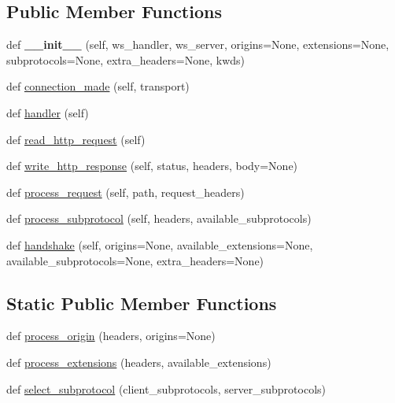 \subsection*{Public Member Functions}
\begin{DoxyCompactItemize}
\item 
\mbox{\label{classwebsockets_1_1server_1_1_web_socket_server_protocol_aa682b0485688aa1a697260b40134c7eb}} 
def {\bfseries \+\_\+\+\_\+init\+\_\+\+\_\+} (self, ws\+\_\+handler, ws\+\_\+server, origins=None, extensions=None, subprotocols=None, extra\+\_\+headers=None, kwds)
\item 
def \hyperlink{classwebsockets_1_1server_1_1_web_socket_server_protocol_aef052fe92634f71575968c743f1e30df}{connection\+\_\+made} (self, transport)
\item 
def \hyperlink{classwebsockets_1_1server_1_1_web_socket_server_protocol_a30403cdb02a26896309300c3ffba0e5b}{handler} (self)
\item 
def \hyperlink{classwebsockets_1_1server_1_1_web_socket_server_protocol_a00330bf7ea1eb9379ba86472cf5c2168}{read\+\_\+http\+\_\+request} (self)
\item 
def \hyperlink{classwebsockets_1_1server_1_1_web_socket_server_protocol_ab2e016a048a0bfc7986db4926e991411}{write\+\_\+http\+\_\+response} (self, status, headers, body=None)
\item 
def \hyperlink{classwebsockets_1_1server_1_1_web_socket_server_protocol_a128b1f24cae9c580c2fa1c98a5755315}{process\+\_\+request} (self, path, request\+\_\+headers)
\item 
def \hyperlink{classwebsockets_1_1server_1_1_web_socket_server_protocol_ab78e73b8a5929bac69346c49039ace85}{process\+\_\+subprotocol} (self, headers, available\+\_\+subprotocols)
\item 
def \hyperlink{classwebsockets_1_1server_1_1_web_socket_server_protocol_a1d684035030b0535f433a9aea1d40b29}{handshake} (self, origins=None, available\+\_\+extensions=None, available\+\_\+subprotocols=None, extra\+\_\+headers=None)
\end{DoxyCompactItemize}
\subsection*{Static Public Member Functions}
\begin{DoxyCompactItemize}
\item 
def \hyperlink{classwebsockets_1_1server_1_1_web_socket_server_protocol_aae78c71a11634a93628a94b8299f40f7}{process\+\_\+origin} (headers, origins=None)
\item 
def \hyperlink{classwebsockets_1_1server_1_1_web_socket_server_protocol_a6357e663ec5b0680f14cb322244b2b8e}{process\+\_\+extensions} (headers, available\+\_\+extensions)
\item 
def \hyperlink{classwebsockets_1_1server_1_1_web_socket_server_protocol_ae54969ad0cf329585d75b8eb81b04d82}{select\+\_\+subprotocol} (client\+\_\+subprotocols, server\+\_\+subprotocols)
\end{DoxyCompactItemize}
